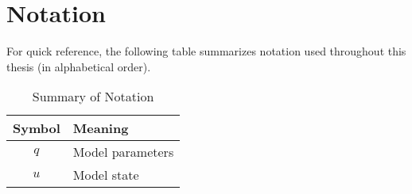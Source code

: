 \chapter{Notation} \label{appendix}

For quick reference, the following table summarizes notation used throughout this thesis 
(in alphabetical order).

\begin{table}[!ht]
\caption{Summary of Notation}
\begin{center}
\begin{tabular}{c|l}
\textbf{Symbol} & \textbf{Meaning} \\
\hline \hline
$q$  &   Model parameters \\
$u$  &   Model state\\
\end{tabular}
\end{center}
\end{table}
